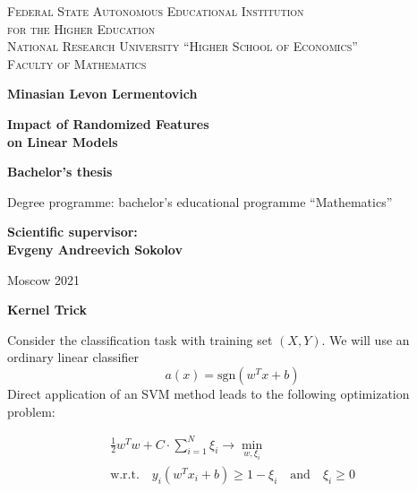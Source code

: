 \documentclass{article}
\theoremstyle{bfnote}
\begin{document}
	

		\begin{center}
			{\scshape Federal State Autonomous Educational Institution\\
				for the Higher Education\\
				National Research University ``Higher School of Economics''\\[1ex]
				Faculty of Mathematics\par}
			
			\par\vfill
			
			\textbf{\large Minasian Levon Lermentovich}
			
			\vspace{1.5cm}
			
			{\Large\bfseries
				Impact of Randomized Features\\ on Linear Models
				\par}
			
			\vspace{1.5cm}
			
			\textbf{\large Bachelor's thesis}
			
			\vspace{1cm}
			
			Degree programme: bachelor's educational programme ``Mathematics''
			
\bigskip		
\bigskip
\bigskip	
			\textbf{ Scientific supervisor:\\ Evgeny Andreevich Sokolov}

			\par\vfill\vfill
			Moscow 2021
		\end{center}
		\thispagestyle{empty}
		\pagebreak
		
		
		
		
	\begin{center}
		\textbf{\large Kernel Trick}
	\end{center}

	Consider the classification task with training set $(X, Y)$. 
	We will use an ordinary linear classifier $$a(x)=\text{sgn}(w^T x + b)$$ Direct application of an SVM method leads to the following optimization problem:
	
	\begin{gather}
	\frac{1}{2} w^T w + C \cdot \sum_{i=1}^N {\xi_i} \rightarrow \min\limits_{w, \xi_i} \\
	\text{w.r.t.} \quad y_i(w^T x_i + b) \ge 1-\xi_i \quad \text{and} \quad \xi_i \ge 0 
	\end{gather}
	
\end{document}
